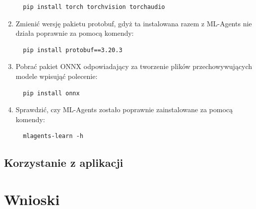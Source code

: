 \documentclass{SGGW-thesis}
\begin{document}
\begin{enumerate}
{\begin{lstlisting}
  pip install torch torchvision torchaudio
  \end{lstlisting}
  }
  \item{Zmienić wersję pakietu protobuf, gdyż ta instalowana razem z ML-Agents nie działa poprawnie za pomocą komendy:
  \begin{lstlisting}
  pip install protobuf==3.20.3
  \end{lstlisting}
  }
  \item{Pobrać pakiet ONNX odpowiadający za tworzenie plików przechowywujących modele wpisująć polecenie:
  \begin{lstlisting}
  pip install onnx
  \end{lstlisting}
  }
  \item{Sprawdzić, czy ML-Agents zostało poprawnie zainstalowane za pomocą komendy:
  \begin{lstlisting}
  mlagents-learn -h
  \end{lstlisting}
  }
\end{enumerate}

\section{Korzystanie z aplikacji}


\chapter{Wnioski}
\end{document}
